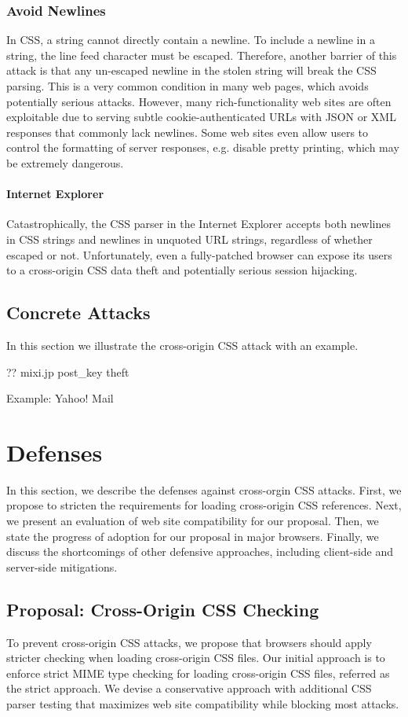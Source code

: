 \documentclass{acm_proc_article-sp}
\begin{document}
{\subsubsection{Avoid Newlines}
In CSS, a string cannot directly contain a newline. To include a newline in a string, the line feed character must be escaped. Therefore, another barrier of this attack is that any un-escaped newline in the stolen string will break the CSS parsing. This is a very common condition in many web pages, which avoids potentially serious attacks. However, many rich-functionality web sites are often exploitable due to serving subtle cookie-authenticated URLs with JSON or XML responses that commonly lack newlines. Some web sites even allow users to control the formatting of server responses, e.g. disable pretty printing, which may be extremely dangerous.
\paragraph{Internet Explorer}
Catastrophically, the CSS parser in the Internet Explorer accepts both newlines in CSS strings and newlines in unquoted URL strings, regardless of whether escaped or not. Unfortunately, even a fully-patched browser can expose its users to a cross-origin CSS data theft and potentially serious session hijacking.

\subsection{Concrete Attacks}
In this section we illustrate the cross-origin CSS attack with an example.

?? mixi.jp post\_key theft\cite{cssxss}

Example: Yahoo! Mail

\section{Defenses}
In this section, we describe the defenses against cross-orgin CSS attacks. First, we propose to stricten the requirements for loading cross-origin CSS references. Next, we present an evaluation of web site compatibility for our proposal. Then, we state the progress of adoption for our proposal in major browsers. Finally, we discuss the shortcomings of other defensive approaches, including client-side and server-side mitigations.

\subsection{Proposal: Cross-Origin CSS Checking}
To prevent cross-origin CSS attacks, we propose that browsers should apply stricter checking when loading cross-origin CSS files. Our initial approach is to enforce strict MIME type checking for loading cross-origin CSS files, referred as the strict approach. We devise a conservative approach with additional CSS parser testing that maximizes web site compatibility while blocking most attacks.

}
\end{document}
